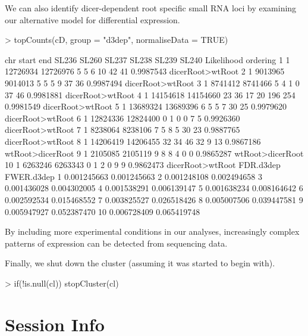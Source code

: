 \documentclass[a4paper]{article}
\begin{document}
We can also identify dicer-dependent root specific small RNA loci by examining our alternative model for differential expression.
\begin{Schunk}
\begin{Sinput}
> topCounts(cD, group = "d3dep", normaliseData = TRUE)  
\end{Sinput}
\begin{Soutput}
   chr    start      end SL236 SL260 SL237 SL238 SL239 SL240 Likelihood         ordering
1    1 12726934 12726976     5     5     6    10    42    41  0.9987543 dicerRoot>wtRoot
2    1  9013965  9014013     5     5     5     9    37    36  0.9987494 dicerRoot>wtRoot
3    1  8741412  8741466     5     4     1     0    37    46  0.9981881 dicerRoot>wtRoot
4    1 14154618 14154660    23    36    17    20   196   254  0.9981549 dicerRoot>wtRoot
5    1 13689324 13689396     6     5     5     7    30    25  0.9979620 dicerRoot>wtRoot
6    1 12824336 12824400     0     1     0     0     7     5  0.9926360 dicerRoot>wtRoot
7    1  8238064  8238106     7     5     8     5    30    23  0.9887765 dicerRoot>wtRoot
8    1 14206419 14206455    32    34    46    32     9    13  0.9867186 wtRoot>dicerRoot
9    1  2105085  2105119     9     8     8     4     0     0  0.9865287 wtRoot>dicerRoot
10   1  6263246  6263343     0     1     2     0     9     9  0.9862473 dicerRoot>wtRoot
     FDR.d3dep  FWER.d3dep
1  0.001245663 0.001245663
2  0.001248108 0.002494658
3  0.001436028 0.004302005
4  0.001538291 0.006139147
5  0.001638234 0.008164642
6  0.002592534 0.015468552
7  0.003825527 0.026518426
8  0.005007506 0.039447581
9  0.005947927 0.052387470
10 0.006728409 0.065419748
\end{Soutput}
\end{Schunk}

By including more experimental conditions in our analyses, increasingly complex patterns of expression can be detected from sequencing data.


Finally, we shut down the cluster (assuming it was started to begin with).
\begin{Schunk}
\begin{Sinput}
> if(!is.null(cl)) stopCluster(cl)
\end{Sinput}
\end{Schunk}


\section*{Session Info}
\end{document}
